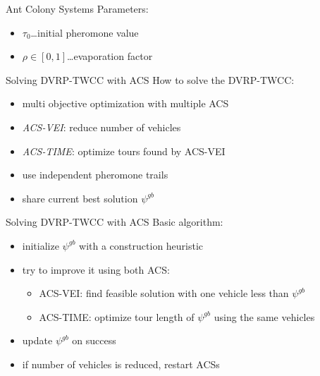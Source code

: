 \documentclass{beamer}
\begin{document}
\begin{frame}{Ant Colony Systems}
  Parameters:
  \begin{itemize}
    \item $\tau_0$\dots initial pheromone value
    \item $\rho \in [0,1]$\dots evaporation factor
  \end{itemize}
  \vspace{5pt}
\end{frame}

\begin{frame}{Solving DVRP-TWCC with ACS}
  How to solve the DVRP-TWCC:
  \begin{itemize}
    \item multi objective optimization with multiple ACS
    \item \emph{ACS-VEI}: reduce number of vehicles
    \item \emph{ACS-TIME}: optimize tours found by ACS-VEI
    \item use independent pheromone trails
    \item share current best solution $\psi^{gb}$
  \end{itemize}

\end{frame}

\begin{frame}{Solving DVRP-TWCC with ACS}
  Basic algorithm:
  \begin{itemize}
    \item initialize $\psi^{gb}$ with a construction heuristic
    \item try to improve it using both ACS:
      \begin{itemize}
        \item ACS-VEI: find feasible solution with one vehicle less than $\psi^{gb}$
	\item ACS-TIME: optimize tour length of $\psi^{gb}$ using the same vehicles
      \end{itemize}
    \item update $\psi^{gb}$ on success
    \item if number of vehicles is reduced, restart ACSs
  \end{itemize}
\end{frame}
\end{document}
